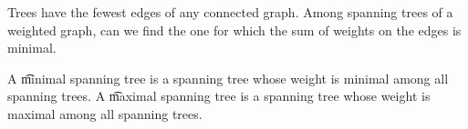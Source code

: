 

Trees have the fewest edges of any connected graph.
Among spanning trees of a weighted graph, can we find the one for which the sum of weights on the edges is minimal.


A \t{minimal spanning tree} is a spanning tree whose weight is minimal among all spanning trees.
A \t{maximal spanning tree} is a spanning tree whose weight is maximal among all spanning trees.

\blankpage
